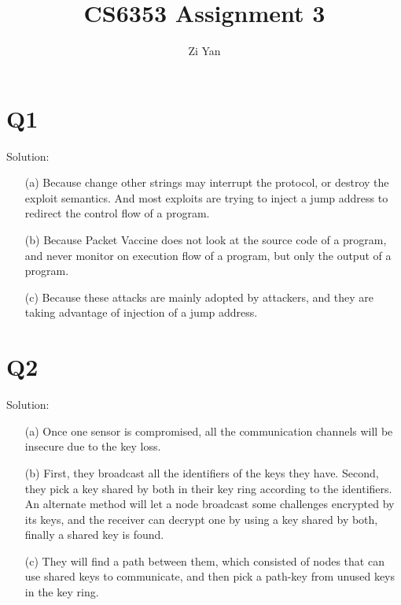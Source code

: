 \documentclass[12pt,letterpaper]{article}
\author{Zi Yan}
\title{CS6353 Assignment 3}
\date{}
\begin{document}
\maketitle

\section{Q1}
Solution:
\begin{itemize}
 \item[(a)] Because change other strings may interrupt the protocol,
 or destroy the exploit semantics. And most exploits are trying to 
 inject a jump address to redirect the control flow of a program.
 \item[(b)] Because Packet Vaccine does not look at the source code
 of a program, and never monitor on execution flow of a program, 
 but only the output of a program.
 \item[(c)] Because these attacks are mainly adopted by attackers,
 and they are taking advantage of injection of a jump address.
\end{itemize}

\section{Q2}
Solution:
\begin{itemize}
 \item[(a)] Once one sensor is compromised, all the communication
 channels will be insecure due to the key loss.
 \item[(b)] First, they broadcast all the identifiers of the keys they have.
 Second, they pick a key shared by both in their key ring according to
 the identifiers. An alternate method will let a node broadcast some 
 challenges encrypted by its keys, and the receiver can decrypt one by
 using a key shared by both, finally a shared key is found.
 \item[(c)] They will find a path between them, which consisted of nodes
 that can use shared keys to communicate, and then pick a path-key from
 unused keys in the key ring.
\end{itemize}
\end{document}
